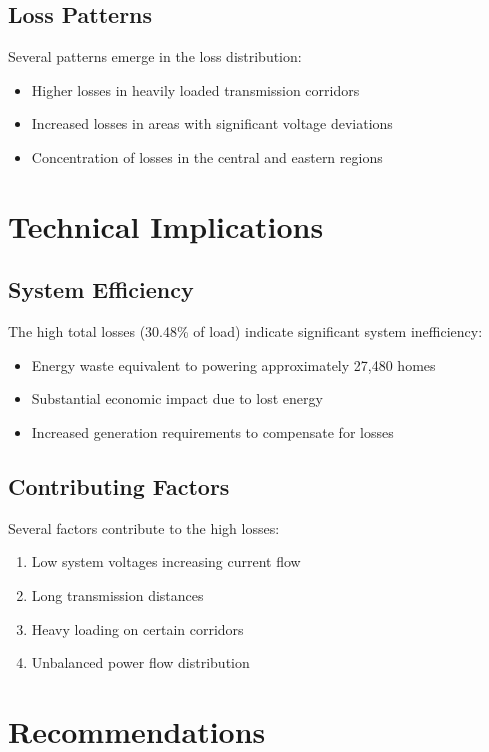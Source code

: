 \documentclass[11pt]{article}
\begin{document}
\subsection{Loss Patterns}
Several patterns emerge in the loss distribution:
\begin{itemize}
    \item Higher losses in heavily loaded transmission corridors
    \item Increased losses in areas with significant voltage deviations
    \item Concentration of losses in the central and eastern regions
\end{itemize}

\section{Technical Implications}

\subsection{System Efficiency}
The high total losses (30.48\% of load) indicate significant system inefficiency:
\begin{itemize}
    \item Energy waste equivalent to powering approximately 27,480 homes
    \item Substantial economic impact due to lost energy
    \item Increased generation requirements to compensate for losses
\end{itemize}

\subsection{Contributing Factors}
Several factors contribute to the high losses:
\begin{enumerate}
    \item Low system voltages increasing current flow
    \item Long transmission distances
    \item Heavy loading on certain corridors
    \item Unbalanced power flow distribution
\end{enumerate}

\section{Recommendations}
\end{document}
